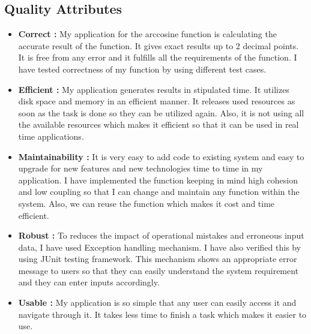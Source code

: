\documentclass[a4paper,11pt]{report}
\begin{document}
 \newpage
 \subsection{Quality Attributes}
 \begin{itemize}
 \item \textbf{Correct : }My application for the arccosine function is calculating the accurate result of the function. It gives exact results up to 2 decimal points. It is free from any error and it fulfills all the requirements of the function. I have tested correctness of my function by using different test cases.\\
 \item \textbf{Efficient : }My application generates results in stipulated time. It utilizes disk space and memory in  an efficient manner. It releases used resources as soon as the task is done so they can be utilized again. Also, it is not using all the available resources which makes it efficient so that it can be used in real time applications.\\
 \item \textbf{Maintainability : }It is very easy to add code to existing system and easy to upgrade for new features and new technologies time to time in my application. I have implemented the function keeping in mind high cohesion and low coupling so that I can change and maintain any function within the system. Also, we can reuse the function which makes it cost and time efficient.\\
 \item \textbf{Robust : }To reduces the impact of operational mistakes and erroneous input data, I have used Exception handling mechanism. I have also verified this by using JUnit testing framework. This mechanism shows an appropriate error message to users so that they can easily understand the system requirement and they can enter inputs accordingly.\\
 \item \textbf{Usable : }My application is so simple that any user can easily access it and navigate through it. It takes less time to finish a task which makes it easier to use.\\
 \end{itemize}
 
 \newpage
\end{document}
